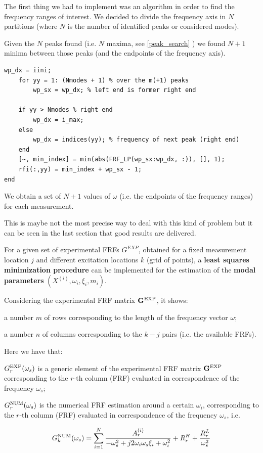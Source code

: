 \documentclass[a4paper,12pt,oneside]{article}
\begin{document}
The first thing we had to implement was an algorithm in order to find the frequency ranges of interest. We decided to divide the frequency axis in $ N $ partitions (where $ N $ is the number of identified peaks or considered modes).

Given the $ N $ peaks found (i.e. $ N $ maxima, see \ref{peak_search} ) we found $ N + 1 $ minima between those peaks (and the endpoints of the frequency axis).

\begin{lstlisting}[caption = {Frequency range search}]
	wp_dx = iini;
	for yy = 1: (Nmodes + 1) % over the m(+1) peaks
		wp_sx = wp_dx; % left end is former right end
    
	if yy > Nmodes % right end
		wp_dx = i_max;
	else
		wp_dx = indices(yy); % frequency of next peak (right end)
	end
	[~, min_index] = min(abs(FRF_LP(wp_sx:wp_dx, :)), [], 1);
	rfi(:,yy) = min_index + wp_sx - 1;
end
\end{lstlisting}

We obtain a set of $ N + 1 $ values of $ \omega $
(i.e. the endpoints of the frequency ranges) for each measurement.

This is maybe not the most precise way to deal with this kind of problem but it can be seen in the last section that good results are delivered.

For a given set of experimental FRFs $ G^{EXP} $, obtained for a fixed measurement location $ j $ and different excitation locations $ k $ (grid of points), a \textbf{least squares minimization procedure} can be implemented for the estimation of the \textbf{modal parameters} $ (X^{(i)}, \omega_i, \xi_i, m_i) $.

Considering the experimental FRF matrix $ \mathbf{G^\textup{EXP}} $, it shows:

\begin{list}{}
	\item a number $ m $ of rows corresponding to the length of the frequency vector $ \omega $;
	\item a number $ n $ of columns corresponding to the $ k - j $ pairs (i.e. the available FRFs).
\end{list}

Here we have that:

\begin{list}{}
	\item $ G_r^\textup{EXP} (\omega_s) $ is a generic element of the experimental FRF matrix $ \mathbf{G^\textup{EXP}} $ corresponding to the $ r $-th column (FRF) evaluated in correspondence of the frequency $ \omega_s $;
	\item $ G_r^\textup{NUM} (\omega_s) $ is the numerical FRF estimation around a certain $ \omega_i $, corresponding to the $ r $-th column (FRF) evaluated in correspondence of the frequency $ \omega_s $, i.e.

		\[
			G^\textup{NUM}_k(\omega_s) = \sum_{i=1}^{N} \frac{ A_{r}^{(i)} }
				{-\omega_s^2 + j 2 \omega_i \omega_s \xi_i + \omega^2_i}
				+ R^H_{r} + \frac{R^L_{r}}{\omega_s^2}
		\]
\end{list}
\end{document}
